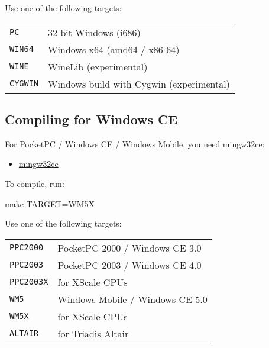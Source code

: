 Use one of the following targets:

\begin{tabular}{lp{8cm}}

\texttt{PC} & 32 bit Windows (i686) \\

\texttt{WIN64} & Windows x64 (amd64 / x86-64) \\

\texttt{WINE} & WineLib (experimental) \\

\texttt{CYGWIN} & Windows build with Cygwin (experimental) \\

\end{tabular}

\subsection{Compiling for Windows CE}

For PocketPC / Windows CE / Windows Mobile, you need mingw32ce:

\begin{itemize}
\item \href{http://max.kellermann.name/projects/cegcc/}{mingw32ce}
\end{itemize}

To compile, run:

\begin{verbatim*}
make TARGET=WM5X
\end{verbatim*}

Use one of the following targets:

\begin{tabular}{lp{8cm}}

\texttt{PPC2000} & PocketPC 2000 / Windows CE 3.0 \\

\texttt{PPC2003} & PocketPC 2003 / Windows CE 4.0 \\

\texttt{PPC2003X} & for XScale CPUs \\

\texttt{WM5} & Windows Mobile / Windows CE 5.0 \\

\texttt{WM5X} & for XScale CPUs \\

\texttt{ALTAIR} & for Triadis Altair \\

\end{tabular}

